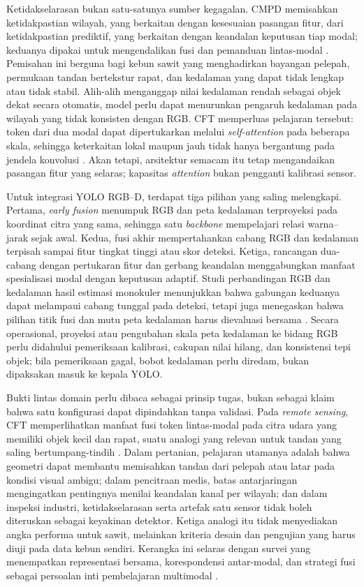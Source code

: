 Ketidakselarasan bukan satu-satunya sumber kegagalan. CMPD memisahkan ketidakpastian wilayah, yang berkaitan dengan kesesuaian pasangan fitur, dari ketidakpastian prediktif, yang berkaitan dengan keandalan keputusan tiap modal; keduanya dipakai untuk mengendalikan fusi dan pemanduan lintas-modal \cite{kim2022cmpd}. Pemisahan ini berguna bagi kebun sawit yang menghadirkan bayangan pelepah, permukaan tandan bertekstur rapat, dan kedalaman yang dapat tidak lengkap atau tidak stabil. Alih-alih menganggap nilai kedalaman rendah sebagai objek dekat secara otomatis, model perlu dapat menurunkan pengaruh kedalaman pada wilayah yang tidak konsisten dengan RGB. CFT memperluas pelajaran tersebut: token dari dua modal dapat dipertukarkan melalui \textit{self-attention} pada beberapa skala, sehingga keterkaitan lokal maupun jauh tidak hanya bergantung pada jendela konvolusi \cite{fang2022cft}. Akan tetapi, arsitektur semacam itu tetap mengandaikan pasangan fitur yang selaras; kapasitas \textit{attention} bukan pengganti kalibrasi sensor.

Untuk integrasi YOLO RGB--D, terdapat tiga pilihan yang saling melengkapi. Pertama, \textit{early fusion} menumpuk RGB dan peta kedalaman terproyeksi pada koordinat citra yang sama, sehingga satu \textit{backbone} mempelajari relasi warna--jarak sejak awal. Kedua, fusi akhir mempertahankan cabang RGB dan kedalaman terpisah sampai fitur tingkat tinggi atau skor deteksi. Ketiga, rancangan dua-cabang dengan pertukaran fitur dan gerbang keandalan menggabungkan manfaat spesialisasi modal dengan keputusan adaptif. Studi perbandingan RGB dan kedalaman hasil estimasi monokuler menunjukkan bahwa gabungan keduanya dapat melampaui cabang tunggal pada deteksi, tetapi juga menegaskan bahwa pilihan titik fusi dan mutu peta kedalaman harus dievaluasi bersama \cite{farahnakian2021fusion}. Secara operasional, proyeksi atau pengubahan skala peta kedalaman ke bidang RGB perlu didahului pemeriksaan kalibrasi, cakupan nilai hilang, dan konsistensi tepi objek; bila pemeriksaan gagal, bobot kedalaman perlu diredam, bukan dipaksakan masuk ke kepala YOLO.

Bukti lintas domain perlu dibaca sebagai prinsip tugas, bukan sebagai klaim bahwa satu konfigurasi dapat dipindahkan tanpa validasi. Pada \textit{remote sensing}, CFT memperlihatkan manfaat fusi token lintas-modal pada citra udara yang memiliki objek kecil dan rapat, suatu analogi yang relevan untuk tandan yang saling bertumpang-tindih \cite{fang2022cft}. Dalam pertanian, pelajaran utamanya adalah bahwa geometri dapat membantu memisahkan tandan dari pelepah atau latar pada kondisi visual ambigu; dalam pencitraan medis, batas antarjaringan mengingatkan pentingnya menilai keandalan kanal per wilayah; dan dalam inspeksi industri, ketidakselarasan serta artefak satu sensor tidak boleh diteruskan sebagai keyakinan detektor. Ketiga analogi itu tidak menyediakan angka performa untuk sawit, melainkan kriteria desain dan pengujian yang harus diuji pada data kebun sendiri. Kerangka ini selaras dengan survei yang menempatkan representasi bersama, korespondensi antar-modal, dan strategi fusi sebagai persoalan inti pembelajaran multimodal \cite{ramachandram2017multimodalreview,feng2021multimodalsurvey}.

